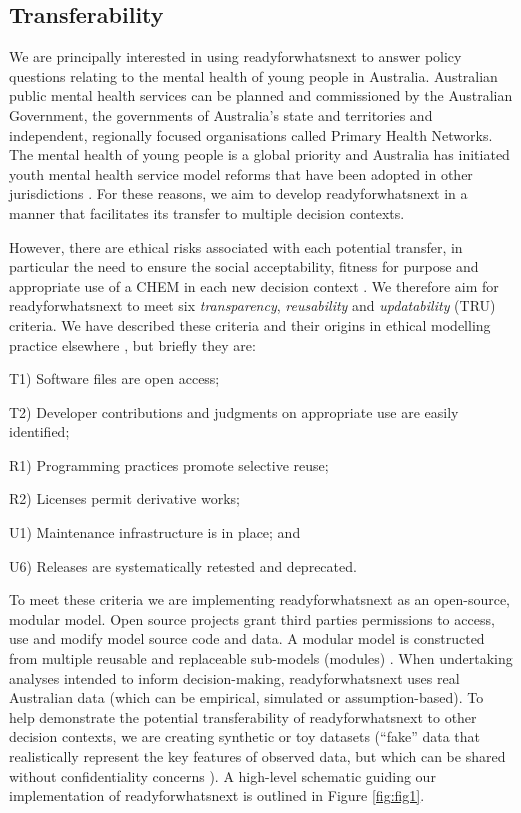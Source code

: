 \documentclass[sn-vancouver,Numbered,pdflatex]{sn-jnl}
\theoremstyle{remark}
\theoremstyle{definition}
\begin{document}
\hypertarget{transferability}{%
\subsection{Transferability}\label{transferability}}

We are principally interested in using readyforwhatsnext to answer policy questions relating to the mental health of young people in Australia. Australian public mental health services can be planned and commissioned by the Australian Government, the governments of Australia's state and territories and independent, regionally focused organisations called Primary Health Networks. The mental health of young people is a global priority \citep{https://doi.org/10.1002/wps.20938} and Australia has initiated youth mental health service model reforms that have been adopted in other jurisdictions \citep{RN27}. For these reasons, we aim to develop readyforwhatsnext in a manner that facilitates its transfer to multiple decision contexts.

However, there are ethical risks associated with each potential transfer, in particular the need to ensure the social acceptability, fitness for purpose and appropriate use of a CHEM in each new decision context \citep{ethicsCHEMS2024}. We therefore aim for readyforwhatsnext to meet six \emph{transparency}, \emph{reusability} and \emph{updatability} (TRU) criteria. We have described these criteria and their origins in ethical modelling practice elsewhere \citep{ethicsCHEMS2024}, but briefly they are:

T1) Software files are open access;

T2) Developer contributions and judgments on appropriate use are easily identified;

R1) Programming practices promote selective reuse;

R2) Licenses permit derivative works;

U1) Maintenance infrastructure is in place; and

U6) Releases are systematically retested and deprecated.

To meet these criteria we are implementing readyforwhatsnext as an open-source, modular model. Open source projects grant third parties permissions to access, use and modify model source code and data. A modular model is constructed from multiple reusable and replaceable sub-models (modules) \citep{pan2021modular}. When undertaking analyses intended to inform decision-making, readyforwhatsnext uses real Australian data (which can be empirical, simulated or assumption-based). To help demonstrate the potential transferability of readyforwhatsnext to other decision contexts, we are creating synthetic or toy datasets (``fake'' data that realistically represent the key features of observed data, but which can be shared without confidentiality concerns \citep{bellovin2019privacy}). A high-level schematic guiding our implementation of readyforwhatsnext is outlined in Figure \ref{fig:fig1}.
\end{document}

